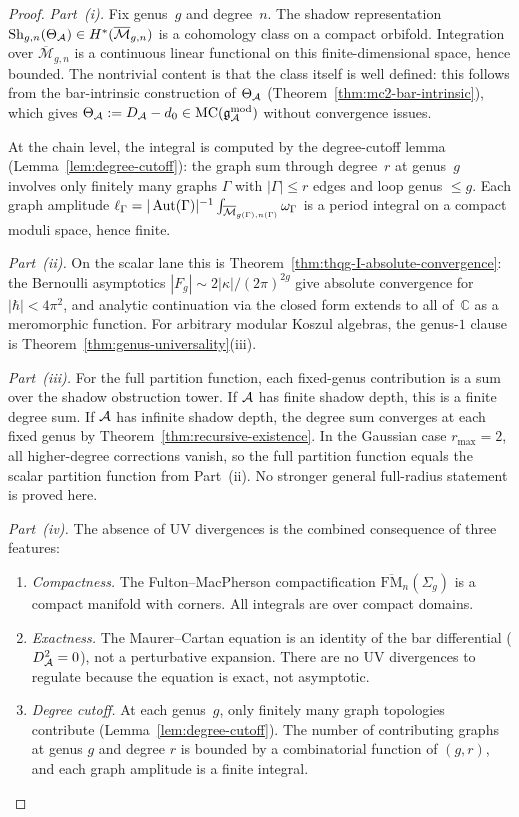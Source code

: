 \begin{proof}
\emph{Part~(i).} Fix genus~$g$ and degree~$n$. The shadow representation $\operatorname{Sh}_{g,n}(\Theta_{\mathcal{A}}) \in H^*(\overline{\mathcal{M}}_{g,n})$ is a cohomology class on a compact orbifold. Integration over $\overline{\mathcal{M}}_{g,n}$ is a continuous linear functional on this finite-dimensional space, hence bounded. The nontrivial content is that the class itself is well defined: this follows from the bar-intrinsic construction of $\Theta_{\mathcal{A}}$ (Theorem~\ref{thm:mc2-bar-intrinsic}), which gives $\Theta_{\mathcal{A}} := D_{\mathcal{A}} - d_0 \in \mathrm{MC}(\mathfrak{g}_{\mathcal{A}}^{\mathrm{mod}})$ without convergence issues.

At the chain level, the integral is computed by the degree-cutoff lemma (Lemma~\ref{lem:degree-cutoff}): the graph sum through degree~$r$ at genus~$g$ involves only finitely many graphs $\Gamma$ with $|\Gamma| \leq r$ edges and loop genus $\leq g$. Each graph amplitude $\ell_\Gamma = |\operatorname{Aut}(\Gamma)|^{-1} \int_{\overline{\mathcal{M}}_{g(\Gamma),n(\Gamma)}} \omega_\Gamma$ is a period integral on a compact moduli space, hence finite.

\emph{Part~(ii).} On the scalar lane this is
Theorem~\ref{thm:thqg-I-absolute-convergence}: the Bernoulli
asymptotics $|F_g| \sim 2|\kappa|/(2\pi)^{2g}$ give absolute
convergence for $|\hbar| < 4\pi^2$, and analytic continuation via the
closed form extends to all of~$\mathbb{C}$ as a meromorphic function.
For arbitrary modular Koszul algebras, the genus-$1$ clause is
Theorem~\ref{thm:genus-universality}\textup{(iii)}.

\emph{Part~(iii).} For the full partition function, each fixed-genus
contribution is a sum over the shadow obstruction tower. If $\mathcal{A}$ has finite
shadow depth, this is a finite degree sum. If $\mathcal{A}$ has infinite
shadow depth, the degree sum converges at each fixed genus by
Theorem~\ref{thm:recursive-existence}. In the Gaussian case
$r_{\max}=2$, all higher-degree corrections vanish, so the full
partition function equals the scalar partition function from
Part~(ii). No stronger general full-radius statement is proved here.

\emph{Part~(iv).} The absence of UV divergences is the combined consequence of three features:
\begin{enumerate}[label=\textup{(\alph*)}]
\item \emph{Compactness.} The Fulton--MacPherson compactification $\overline{\mathrm{FM}}_n(\Sigma_g)$ is a compact manifold with corners. All integrals are over compact domains.
\item \emph{Exactness.} The Maurer--Cartan equation is an identity of the bar differential ($D_{\mathcal{A}}^2 = 0$), not a perturbative expansion. There are no UV divergences to regulate because the equation is exact, not asymptotic.
\item \emph{Degree cutoff.} At each genus~$g$, only finitely many graph topologies contribute (Lemma~\ref{lem:degree-cutoff}). The number of contributing graphs at genus $g$ and degree $r$ is bounded by a combinatorial function of $(g,r)$, and each graph amplitude is a finite integral.
\end{enumerate}
\end{proof}

